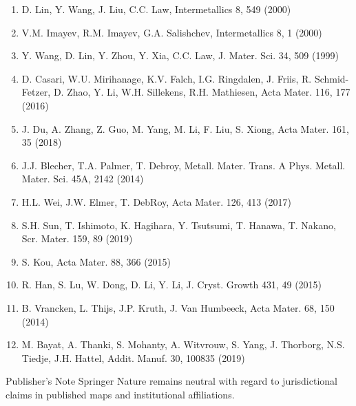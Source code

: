 \documentclass[10pt]{article}
\begin{document}
\begin{enumerate}
  \item D. Lin, Y. Wang, J. Liu, C.C. Law, Intermetallics 8, 549 (2000)

  \item V.M. Imayev, R.M. Imayev, G.A. Salishchev, Intermetallics 8, 1 (2000)

  \item Y. Wang, D. Lin, Y. Zhou, Y. Xia, C.C. Law, J. Mater. Sci. 34, 509 (1999)

  \item D. Casari, W.U. Mirihanage, K.V. Falch, I.G. Ringdalen, J. Friis, R. Schmid-Fetzer, D. Zhao, Y. Li, W.H. Sillekens, R.H. Mathiesen, Acta Mater. 116, 177 (2016)

  \item J. Du, A. Zhang, Z. Guo, M. Yang, M. Li, F. Liu, S. Xiong, Acta Mater. 161, 35 (2018)

  \item J.J. Blecher, T.A. Palmer, T. Debroy, Metall. Mater. Trans. A Phys. Metall. Mater. Sci. 45A, 2142 (2014)

  \item H.L. Wei, J.W. Elmer, T. DebRoy, Acta Mater. 126, 413 (2017)

  \item S.H. Sun, T. Ishimoto, K. Hagihara, Y. Tsutsumi, T. Hanawa, T. Nakano, Scr. Mater. 159, 89 (2019)

  \item S. Kou, Acta Mater. 88, 366 (2015)

  \item R. Han, S. Lu, W. Dong, D. Li, Y. Li, J. Cryst. Growth 431, 49 (2015)

  \item B. Vrancken, L. Thijs, J.P. Kruth, J. Van Humbeeck, Acta Mater. 68, 150 (2014)

  \item M. Bayat, A. Thanki, S. Mohanty, A. Witvrouw, S. Yang, J. Thorborg, N.S. Tiedje, J.H. Hattel, Addit. Manuf. 30, 100835 (2019)

\end{enumerate}

Publisher's Note Springer Nature remains neutral with regard to jurisdictional claims in published maps and institutional affiliations.
\end{document}
